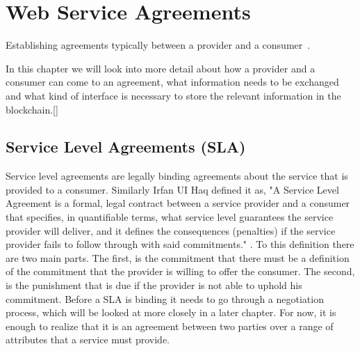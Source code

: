 \chapter{Web Service Agreements}

\begin{center}
  \begin{minipage}{0.5\textwidth}
    \begin{small}
      Establishing agreements typically between a provider and a consumer~\cite{andrieux2007web}.
    \end{small}
  \end{minipage}
  \vspace{0.5cm}
\end{center}

In this chapter we will look into more detail about how a provider and a consumer can come to an agreement, what information needs to be exchanged and what kind of interface is necessary to store the relevant information in the blockchain.[]

\section{Service Level Agreements (SLA)}
Service level agreements are legally binding agreements about the service that is provided to a consumer. Similarly Irfan UI Haq defined it as, "A Service Level Agreement is a formal, legal contract between a service provider and a consumer that specifies, in quantifiable terms, what service level guarantees the service provider will deliver, and it defines the consequences (penalties) if the service provider fails to follow through with said commitments." \cite{TODO PHD THESISIRFAN}. To this definition there are two main parts. The first, is the commitment that there must be a definition of the commitment that the provider is willing to offer the consumer. The second, is the punishment that is due if the provider is not able to uphold his commitment. Before a SLA is binding it needs to go through a negotiation process, which will be looked at more closely in a later chapter. For now, it is enough to realize that it is an agreement between two parties over a range of attributes that a service must provide.

